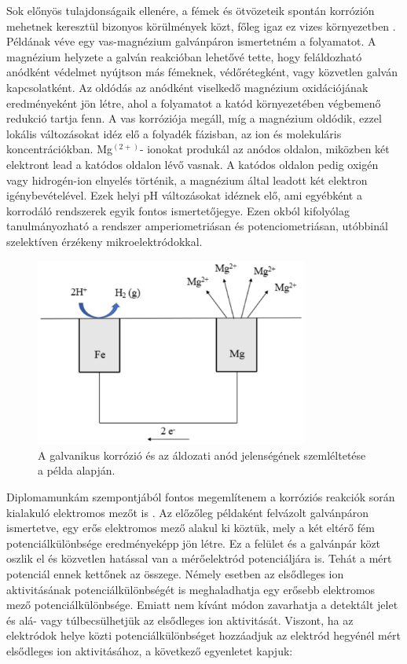 Sok előnyös tulajdonságaik ellenére, a fémek és ötvözeteik spontán korrózión mehetnek keresztül bizonyos körülmények közt, főleg igaz ez vizes környezetben \cite{izquierdo2013potentiometric}. Példának véve egy vas-magnézium galvánpáron ismertetném a folyamatot. A magnézium helyzete a galván reakcióban lehetővé tette, hogy feláldozható anódként védelmet nyújtson más fémeknek, védőrétegként, vagy közvetlen galván kapcsolatként. Az oldódás az anódként viselkedő magnézium oxidációjának eredményeként jön létre, ahol a folyamatot a katód környezetében végbemenő redukció tartja fenn. A vas korróziója megáll, míg a magnézium oldódik, ezzel lokális változásokat idéz elő a folyadék fázisban, az ion és molekuláris koncentrációkban. Mg$^(2+)$- ionokat produkál az anódos oldalon, miközben két elektront lead a katódos oldalon lévő vasnak. A katódos oldalon pedig oxigén vagy hidrogén-ion elnyelés történik, a magnézium által leadott két elektron igénybevételével. Ezek helyi pH változásokat idéznek elő, ami egyébként a korrodáló rendszerek egyik fontos ismertetőjegye.  Ezen okból kifolyólag tanulmányozható a rendszer amperiometriásan és potenciometriásan, utóbbinál szelektíven érzékeny mikroelektródokkal.

\begin{figure}
\centering
\includegraphics[width=0.8\textwidth]{img/corrosion.eps}
\caption{A galvanikus korrózió és az áldozati anód jelenségének szemléltetése a példa alapján.}
\label{fig:corrosion}
\end{figure}

Diplomamunkám szempontjából fontos megemlítenem a korróziós reakciók során kialakuló elektromos mezőt is \cite{kiss2017effect}. Az előzőleg példaként felvázolt galvánpáron ismertetve, egy erős elektromos mező alakul ki köztük, mely a két eltérő fém potenciálkülönbsége eredményeképp jön létre. Ez a felület és a galvánpár közt oszlik el és közvetlen hatással van a mérőelektród potenciáljára is. Tehát a mért potenciál ennek kettőnek az összege. Némely esetben az elsődleges ion aktivitásának potenciálkülönbségét is meghaladhatja egy erősebb elektromos mező potenciálkülönbsége. Emiatt nem kívánt módon zavarhatja a detektált jelet és alá- vagy túlbecsülhetjük az elsődleges ion aktivitását. Viszont, ha az elektródok helye közti potenciálkülönbséget hozzáadjuk az elektród hegyénél mért elsődleges ion aktivitásához, a következő egyenletet kapjuk:

